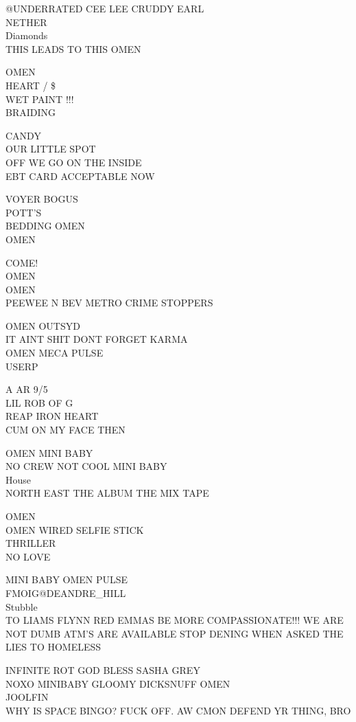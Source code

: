\documentclass[10pt,letterpaper]{article}
\begin{document}
@UNDERRATED CEE LEE CRUDDY EARL\\
NETHER\\
Diamonds\\
THIS LEADS TO THIS OMEN

OMEN\\
HEART / \$\\
WET PAINT !!!\\
BRAIDING

CANDY\\
OUR LITTLE SPOT\\
OFF WE GO ON THE INSIDE\\
EBT CARD ACCEPTABLE NOW

VOYER BOGUS\\
POTT'S\\
BEDDING OMEN\\
OMEN

COME!\\
OMEN\\
OMEN\\
PEEWEE N BEV METRO CRIME STOPPERS

OMEN OUTSYD\\
IT AINT SHIT DONT FORGET KARMA\\
OMEN MECA PULSE\\
USERP

A AR 9/5\\
LIL ROB OF G\\
REAP IRON HEART\\
CUM ON MY FACE THEN

OMEN MINI BABY\\
NO CREW NOT COOL MINI BABY\\
House\\
NORTH EAST THE ALBUM THE MIX TAPE

OMEN\\
OMEN WIRED SELFIE STICK\\
THRILLER\\
NO LOVE

MINI BABY OMEN PULSE\\
FMOIG@DEANDRE\_HILL\\
Stubble\\
TO LIAMS FLYNN RED EMMAS BE MORE COMPASSIONATE!!! WE ARE NOT DUMB ATM'S ARE AVAILABLE STOP DENING WHEN ASKED THE LIES TO HOMELESS

INFINITE ROT GOD BLESS SASHA GREY\\
NOXO MINIBABY GLOOMY DICKSNUFF OMEN\\
JOOLFIN\\
WHY IS SPACE BINGO?  FUCK OFF.  AW CMON DEFEND YR THING, BRO
\end{document}

